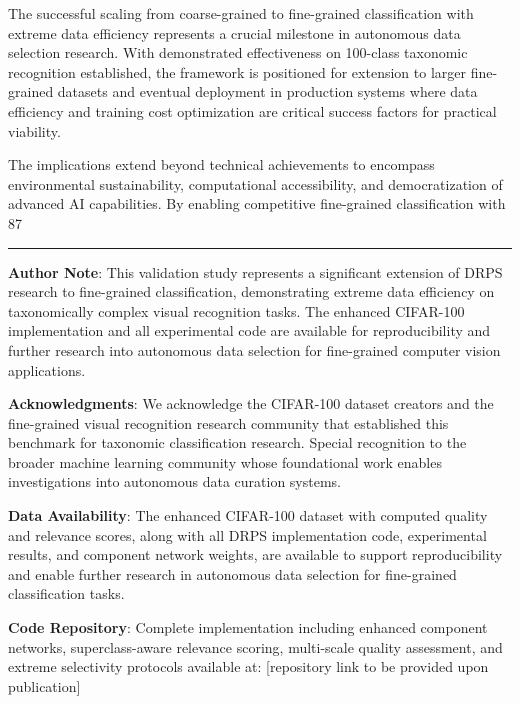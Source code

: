 \documentclass[12pt]{article}
\begin{document}
The successful scaling from coarse-grained to fine-grained classification with extreme data efficiency represents a crucial milestone in autonomous data selection research. With demonstrated effectiveness on 100-class taxonomic recognition established, the framework is positioned for extension to larger fine-grained datasets and eventual deployment in production systems where data efficiency and training cost optimization are critical success factors for practical viability.

The implications extend beyond technical achievements to encompass environmental sustainability, computational accessibility, and democratization of advanced AI capabilities. By enabling competitive fine-grained classification with 87%

\begin{center}\rule{0.5\linewidth}{0.5pt}\end{center}

\textbf{Author Note}: This validation study represents a significant extension of DRPS research to fine-grained classification, demonstrating extreme data efficiency on taxonomically complex visual recognition tasks. The enhanced CIFAR-100 implementation and all experimental code are available for reproducibility and further research into autonomous data selection for fine-grained computer vision applications.

\textbf{Acknowledgments}: We acknowledge the CIFAR-100 dataset creators and the fine-grained visual recognition research community that established this benchmark for taxonomic classification research. Special recognition to the broader machine learning community whose foundational work enables investigations into autonomous data curation systems.

\textbf{Data Availability}: The enhanced CIFAR-100 dataset with computed quality and relevance scores, along with all DRPS implementation code, experimental results, and component network weights, are available to support reproducibility and enable further research in autonomous data selection for fine-grained classification tasks.

\textbf{Code Repository}: Complete implementation including enhanced component networks, superclass-aware relevance scoring, multi-scale quality assessment, and extreme selectivity protocols available at: [repository link to be provided upon publication]
\end{document}
